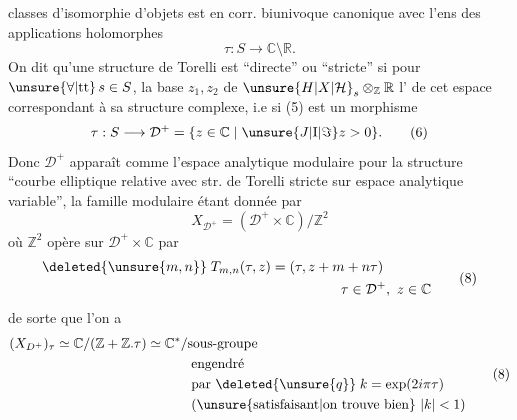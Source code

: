 classes d'isomorphie d'objets  est en corr. biunivoque canonique avec l'ens des applications holomorphes
\makeatletter\tagsleft@true\makeatother
\[
\tau:S\longrightarrow\mathbb C\setminus\mathbb R . \tag*{(5)}
\]
On dit qu'une structure de Torelli est ``directe'' ou ``stricte'' si  pour $\unsure{\forall|\mathrm{tt}}\,s\in S$, la base  $z_1,z_2$ de $\unsure{H|X|\mathcal H}_s\otimes_{\mathbb Z}\mathbb R$  l' de cet espace correspondant à sa structure complexe, i.e si (5) est un morphisme
\[
\tau:S\longrightarrow\mathcal D^+=\{z\in\mathbb C\mid\unsure{J|\mathrm I|\Im}z>0\}. \tag*{(6)}
\]
Donc $\mathcal D^+$ apparaît comme l'espace analytique modulaire pour la structure ``courbe elliptique relative avec str. de Torelli stricte sur espace analytique variable'', la famille modulaire étant donnée par
\[
X_{\mathcal D^+}=(\mathcal D^+\times\mathbb C)/\mathbb Z^2 \tag*{(7)}
\]
où $\mathbb Z^2$ opère sur $\mathcal D^+\times\mathbb C$ par
\[
\begin{aligned}
\deleted{\unsure{m,n}}\;T_{m,n}(\tau,z)&=(\tau,z+m+n\tau)\\
&\hspace{5em}\tau\in\mathcal D^+,\ z\in\mathbb C
\end{aligned}\tag*{(8)}
\]
de sorte que l'on a
\[
\begin{aligned}
(X_{D^+})_\tau &\simeq \mathbb C/(\mathbb Z+\mathbb Z.\tau)\simeq\mathbb C^*/\text{sous-groupe}\\
&\hspace{10em}\text{engendré}\\
&\hspace{10em}\text{par }\deleted{\unsure{q}}\;k=\exp(2i\pi\tau)\\
&\hspace{10em}\text{(\unsure{satisfaisant|on trouve bien} }|k|<1\text{)}
\end{aligned}\tag*{(8)}
\]
